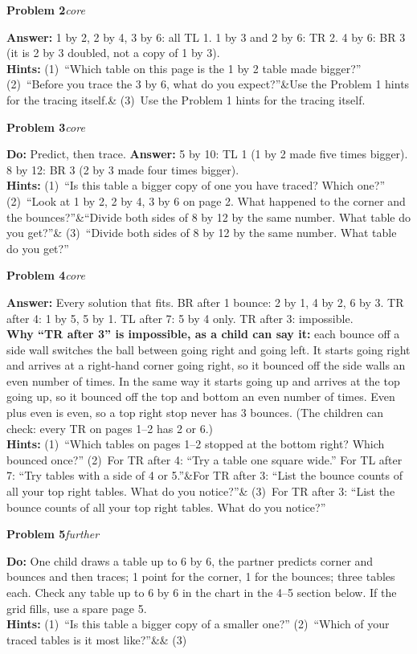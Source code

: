 \documentclass[11pt,letterpaper]{article}
\newcommand{\prob}[3]{\needspace{3\baselineskip}\par\smallskip\textbf{#1}\enspace\textit{#2}\enspace{\small(#3)}\par}
\newcommand{\what}{\textbf{Do:} }
\newcommand{\ans}{\textbf{Answer:} }
\newcommand{\hints}[3]{\textbf{Hints:} (1)~#1 (2)~#2\ifx&#3&\else{} (3)~#3\fi\par}
\newcommand{\core}{core}
\newcommand{\further}{further}
\begin{document}
\prob{Problem 2}{\core}{page 2}
\ans 1 by 2, 2 by 4, 3 by 6: all TL 1. 1 by 3 and 2 by 6: TR 2. 4 by 6: BR 3 (it is 2 by 3 doubled, not a copy of 1 by 3).\\
\hints{``Which table on this page is the 1 by 2 table made bigger?''}{``Before you trace the 3 by 6, what do you expect?''}{Use the Problem 1 hints for the tracing itself.}

\prob{Problem 3}{\core}{page 3}
\what Predict, then trace. \ans 5 by 10: TL 1 (1 by 2 made five times bigger). 8 by 12: BR 3 (2 by 3 made four times bigger).\\
\hints{``Is this table a bigger copy of one you have traced? Which one?''}{``Look at 1 by 2, 2 by 4, 3 by 6 on page 2. What happened to the corner and the bounces?''}{``Divide both sides of 8 by 12 by the same number. What table do you get?''}

\prob{Problem 4}{\core}{page 4, grids 6 by 6}
\ans Every solution that fits. BR after 1 bounce: 2 by 1, 4 by 2, 6 by 3. TR after 4: 1 by 5, 5 by 1. TL after 7: 5 by 4 only. TR after 3: impossible.\\
\textbf{Why ``TR after 3'' is impossible, as a child can say it:} each bounce off a side wall switches the ball between going right and going left. It starts going right and arrives at a right-hand corner going right, so it bounced off the side walls an even number of times. In the same way it starts going up and arrives at the top going up, so it bounced off the top and bottom an even number of times. Even plus even is even, so a top right stop never has 3 bounces. (The children can check: every TR on pages 1--2 has 2 or 6.)\\
\hints{``Which tables on pages 1--2 stopped at the bottom right? Which bounced once?''}{For TR after 4: ``Try a table one square wide.'' For TL after 7: ``Try tables with a side of 4 or 5.''}{For TR after 3: ``List the bounce counts of all your top right tables. What do you notice?''}

\prob{Problem 5}{\further}{page 5, game}
\what One child draws a table up to 6 by 6, the partner predicts corner and bounces and then traces; 1 point for the corner, 1 for the bounces; three tables each. Check any table up to 6 by 6 in the chart in the 4--5 section below. If the grid fills, use a spare page 5.\\
\hints{``Is this table a bigger copy of a smaller one?''}{``Which of your traced tables is it most like?''}{}
\end{document}
